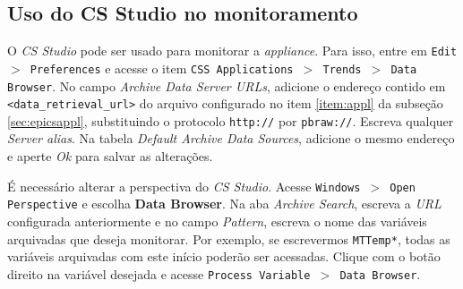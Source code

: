 \subsection{Uso do CS Studio no monitoramento}

O \textit{CS Studio} pode ser usado para monitorar a \textit{appliance}. Para
isso, entre em \texttt{Edit \(>\) Preferences} e acesse o item \texttt{CSS
Applications \(>\) Trends \(>\) Data Browser}. No campo \textit{Archive Data
Server URLs}, adicione o endereço contido em \texttt{<data\_retrieval\_url>} do
arquivo configurado no item \ref{item:appl} da subseção \ref{sec:epicsappl},
substituindo o protocolo \texttt{http://} por \texttt{pbraw://}. Escreva
qualquer \textit{Server alias}. Na tabela \textit{Default Archive Data Sources},
adicione o mesmo endereço e aperte \textit{Ok} para salvar as alterações.

\vspace{12pt}

É necessário alterar a perspectiva do \textit{CS Studio}. Acesse
\texttt{Windows \(>\) Open Perspective} e escolha \textbf{Data Browser}. Na aba
\textit{Archive Search}, escreva a \textit{URL} configurada anteriormente e no
campo \textit{Pattern}, escreva o nome das variáveis arquivadas que deseja
monitorar. Por exemplo, se escrevermos \texttt{MTTemp*}, todas as variáveis
arquivadas com este início poderão ser acessadas. Clique com o botão direito na
variável desejada e acesse \texttt{Process Variable \(>\) Data Browser}.
